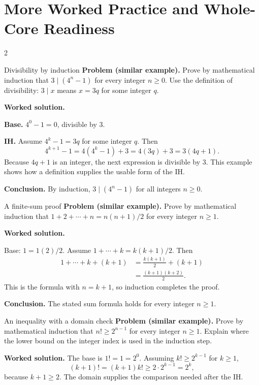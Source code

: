 \documentclass[10pt]{article}
\begin{document}
\clearpage
\section*{More Worked Practice and Whole-Core Readiness}
\begin{multicols}{2}
\begin{workedbox}{Divisibility by induction}
\textbf{Problem (similar example).} Prove by mathematical induction that
$3\mid(4^n-1)$ for every integer $n\ge0$. Use the definition of divisibility:
$3\mid x$ means $x=3q$ for some integer $q$.

\textbf{Worked solution.}

\textbf{Base.} $4^0-1=0$, divisible by $3$.

\textbf{IH.} Assume $4^k-1=3q$ for some integer $q$. Then
\[
4^{k+1}-1=4(4^k-1)+3=4(3q)+3=3(4q+1).
\]
Because $4q+1$ is an integer, the next expression is divisible by $3$. This
example shows how a definition supplies the usable form of the IH.

\textbf{Conclusion.} By induction, $3\mid(4^n-1)$ for all integers $n\ge0$.
\end{workedbox}

\begin{workedbox}{A finite-sum proof}
\textbf{Problem (similar example).} Prove by mathematical induction that
$1+2+\cdots+n=n(n+1)/2$ for every integer $n\ge1$.

\textbf{Worked solution.}

Base: $1=1(2)/2$. Assume
$1+\cdots+k=k(k+1)/2$. Then
\begin{align*}
1+\cdots+k+(k+1)
&=\frac{k(k+1)}2+(k+1)\\
&=\frac{(k+1)(k+2)}2.
\end{align*}
This is the formula with $n=k+1$, so induction completes the proof.

\textbf{Conclusion.} The stated sum formula holds for every integer $n\ge1$.
\end{workedbox}

\begin{workedbox}{An inequality with a domain check}
\textbf{Problem (similar example).} Prove by mathematical induction that
$n!\ge2^{n-1}$ for every integer $n\ge1$. Explain where the lower bound on
the integer index is used in the induction step.

\textbf{Worked solution.} The base is $1!=1=2^0$. Assuming
$k!\ge2^{k-1}$ for $k\ge1$,
\[
(k+1)!=(k+1)k!\ge2\cdot2^{k-1}=2^k,
\]
because $k+1\ge2$. The domain supplies the comparison needed after the IH.


\end{workedbox}
\end{multicols}
\end{document}
